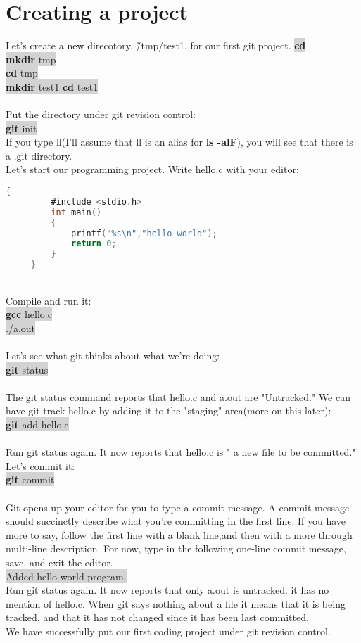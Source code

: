 \documentclass{article}
\begin{document}
  \section{Creating a project}
  Let's create a new direcotory, \~/tmp/test1, for our first git project.
  \colorbox{lightgray}{
	  \textbf {cd}\\
	  \textbf {mkdir} tmp\\
	  \textbf {cd} tmp\\
	  \textbf {mkdir} test1
	  \textbf {cd} test1\\
  }\\
  Put the directory under git revision control:\\
  \colorbox{lightgray}{
	 \textbf{git} init
 }\\
 If you type ll(I'll assume that ll is an alias for \textbf{ls -alF}), you will see that there is a .git directory.\\
 Let's start our programming project. Write hello.c with your editor:\\
	 \begin{lstlisting}[language=C]{
		 #include <stdio.h>
		 int main()
		 {
			 printf("%s\n","hello world");
			 return 0;
		 }
	 }
	 \end{lstlisting}\\
 Compile and run it:\\
 \colorbox{lightgray}{
	 \textbf{gcc} hello.c\\
	 ./a.out\\
 }\\
 Let's see what git thinks about what we're doing:\\
 \colorbox{lightgray}{
	 \textbf{git} status\\
 }\\
 The git status command reports that hello.c and a.out are "Untracked." We can have git track hello.c by adding it to the "staging" area(more on this later):\\
 \colorbox{lightgray}{
	 \textbf{git} add hello.c\\
 }\\
 Run git status again. It now reports that hello.c is " a new file to be committed." Let's commit it:\\
 \colorbox{lightgray}{
	 \textbf{git} commit\\
 }\\
 Git opens up your editor for you to type a commit message. A commit message should succinctly describe what you're committing in the first line. If you have more to say, follow the first line with a blank line,and then with a more through multi-line description.
 For now, type in the following one-line commit message, save, and exit the editor.\\
 \colorbox{lightgray}{
	 Added hello-world program.
 }\\
 Run git status again. It now reports that only a.out is untracked. it has no mention of hello.c. When git says nothing about a file it means that it is being tracked, and that it has not changed since it has been last committed.\\
 We have successfully put our first coding project under git revision control.\\
\end{document}
